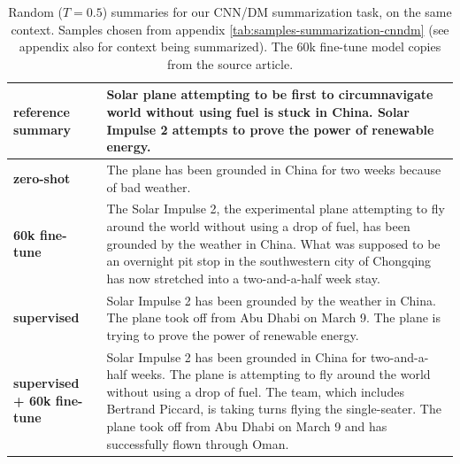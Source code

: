 \begin{table}[t]
\begin{center}
\begin{tabular}{|p{2cm}|p{12cm}|}

\hline
\textbf{reference summary}
&
Solar plane attempting to be first to circumnavigate world without using fuel is stuck in China. Solar Impulse 2 attempts to prove the power of renewable energy.\\
\hline
\hline
\textbf{zero-shot}
&
The plane has been grounded in China for two weeks because of bad weather.
\\
\hline
\textbf{60k fine-tune}
&
The Solar Impulse 2, the experimental plane attempting to fly around the world without using a drop of fuel, has been grounded by the weather in China.
\newline\newline
What was supposed to be an overnight pit stop in the southwestern city of Chongqing has now stretched into a two-and-a-half week stay.
\\
\hline
\textbf{supervised}
&
Solar Impulse 2 has been grounded by the weather in China. The plane took off from Abu Dhabi on March 9. The plane is trying to prove the power of renewable energy.
\\
\hline
\textbf{supervised + 60k fine-tune}
&
Solar Impulse 2 has been grounded in China for two-and-a-half weeks. The plane is attempting to fly around the world without using a drop of fuel. The team, which includes Bertrand Piccard, is taking turns flying the single-seater. The plane took off from Abu Dhabi on March 9 and has successfully flown through Oman.
\\
\hline

\end{tabular}
\caption{Random ($T=0.5$) summaries for our CNN/DM summarization task, on the same context.  Samples chosen from appendix \cref{tab:samples-summarization-cnndm} (see appendix also for context being summarized).  The 60k fine-tune model copies from the source article. }
\label{tab:summarization-body-samples}
\end{center}
\vspace{-.1in}
\end{table}
    